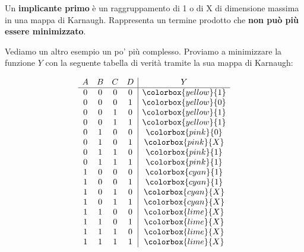 \documentclass[11pt, a4paper, titlepage, oneside]{scrbook}
\begin{document}
\begin{Definizione}
\label{def-implicante-primo}
Un \textbf{implicante primo} è un raggruppamento di 1 o di X di dimensione massima in una mappa di Karnaugh. Rappresenta un termine prodotto che \textbf{non può più essere minimizzato}.
\end{Definizione}

Vediamo un altro esempio un po' più complesso. Proviamo a minimizzare la funzione $Y$ con la seguente tabella di verità tramite la sua mappa di Karnaugh:

\begin{minipage}[c]{0.35\textwidth}
\centering
\[
\begin{array}{cccc|c}
A & B & C & D & Y \\
\hline
0 & 0 & 0 & 0 & \colorbox{yellow}{1} \\
0 & 0 & 0 & 1 & \colorbox{yellow}{0} \\
0 & 0 & 1 & 0 & \colorbox{yellow}{1} \\
0 & 0 & 1 & 1 & \colorbox{yellow}{1} \\
0 & 1 & 0 & 0 & \colorbox{pink}{0} \\
0 & 1 & 0 & 1 & \colorbox{pink}{X} \\
0 & 1 & 1 & 0 & \colorbox{pink}{1} \\
0 & 1 & 1 & 1 & \colorbox{pink}{1} \\
1 & 0 & 0 & 0 & \colorbox{cyan}{1} \\
1 & 0 & 0 & 1 & \colorbox{cyan}{1} \\
1 & 0 & 1 & 0 & \colorbox{cyan}{X} \\
1 & 0 & 1 & 1 & \colorbox{cyan}{X} \\
1 & 1 & 0 & 0 & \colorbox{lime}{X} \\
1 & 1 & 0 & 1 & \colorbox{lime}{X} \\
1 & 1 & 1 & 0 & \colorbox{lime}{X} \\
1 & 1 & 1 & 1 & \colorbox{lime}{X}
\end{array}
\]
\end{minipage}\hfill
\end{document}
